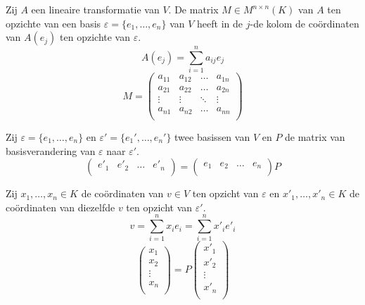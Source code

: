 \documentclass[main.tex]{subfiles}
\begin{document}
\begin{st}
  Zij $A$ een lineaire transformatie van $V$.
  De matrix $M\in M^{n\times n}(K)$ van $A$ ten opzichte van een basis $\varepsilon = \{e_{1},\dotsc,e_{n}\}$ van $V$ heeft in de $j$-de kolom de co\"ordinaten van $A(e_{j})$ ten opzichte van $\varepsilon$.
  \[ A(e_{j}) = \sum_{i=1}^{n}a_{ij}e_{j} \]
  \[ 
  M = 
  \begin{pmatrix}
    a_{11} & a_{12} & \hdots & a_{1n}\\
    a_{21} & a_{22} & \hdots & a_{2n}\\
    \vdots & \vdots & \ddots & \vdots\\
    a_{n1} & a_{n2} & \hdots & a_{nn}\\
  \end{pmatrix}
  \]
\end{st}

\begin{st}
  Zij $\varepsilon = \{e_{1},\dotsc,e_{n}\}$ en $\varepsilon'= \{ e_{1}',\dotsc,e_{n}'\}$ twee basissen van $V$ en $P$ de matrix van basisverandering van $\varepsilon$ naar $\varepsilon'$.
  \[ 
  \begin{pmatrix}
    e'_{1} & e'_{2} & \hdots & e'_{n}\\
  \end{pmatrix}
  =
  \begin{pmatrix}
    e_{1} & e_{2} & \hdots & e_{n}\\
  \end{pmatrix}
  P
  \]
\end{st}
 
\begin{st}
  Zij $x_{1},\dotsc,x_{n}\in K$ de co\"ordinaten van $v\in V$ ten opzicht van $\varepsilon$ en $x'_{1},\dotsc,x'_{n}\in K$ de co\"ordinaten van diezelfde $v$ ten opzicht van $\varepsilon'$.
  \[ v = \sum_{i=1}^{n}x_{i}e_{i} = \sum_{i=1}^{n}x'_{i}e'_{i}\]
  \[ 
  \begin{pmatrix}
    x_{1} \\ x_{2} \\ \vdots \\ x_{n}\\
  \end{pmatrix}
  =
  P
  \begin{pmatrix}
    x'_{1} \\ x'_{2} \\ \vdots \\ x'_{n}\\
  \end{pmatrix}
  \]
\end{st}
\end{document}
